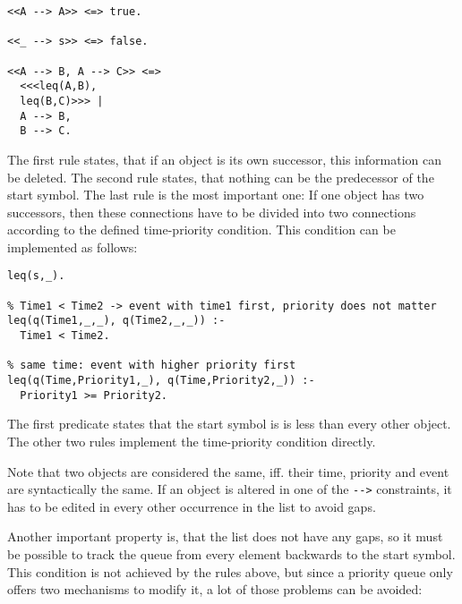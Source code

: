 \begin{lstlisting}
<<A --> A>> <=> true.

<<_ --> s>> <=> false.

<<A --> B, A --> C>> <=>
  <<<leq(A,B),
  leq(B,C)>>> |
  A --> B,
  B --> C.
\end{lstlisting}

The first rule states, that if an object is its own successor, this information can be deleted. The second rule states, that nothing can be the predecessor of the start symbol. The last rule is the most important one: If one object has two successors, then these connections have to be divided into two connections according to the defined time-priority condition. This condition can be implemented as follows:

\begin{lstlisting}
leq(s,_).

% Time1 < Time2 -> event with time1 first, priority does not matter
leq(q(Time1,_,_), q(Time2,_,_)) :- 
  Time1 < Time2.

% same time: event with higher priority first
leq(q(Time,Priority1,_), q(Time,Priority2,_)) :- 
  Priority1 >= Priority2.
\end{lstlisting}

The first predicate states that the start symbol is is less than every other object. The other two rules implement the time-priority condition directly.

Note that two objects are considered the same, iff. their time, priority and event are syntactically the same. If an object is altered in one of the \lstinline|-->| constraints, it has to be edited in every other occurrence in the   list to avoid gaps.

Another important property is, that the list does not have any gaps, so it must be possible to track the queue from every element backwards to the start symbol. This condition is not achieved by the rules above, but since a priority queue only offers two mechanisms to modify it, a lot of those problems can be avoided:

